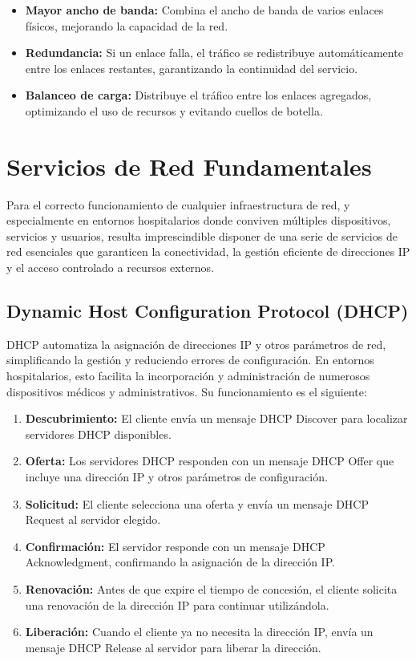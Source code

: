 \begin{itemize}
    \item \textbf{Mayor ancho de banda:} Combina el ancho de banda de varios enlaces físicos, mejorando la capacidad de la red.
    \item \textbf{Redundancia:} Si un enlace falla, el tráfico se redistribuye automáticamente entre los enlaces restantes, garantizando la continuidad del servicio.
    \item \textbf{Balanceo de carga:} Distribuye el tráfico entre los enlaces agregados, optimizando el uso de recursos y evitando cuellos de botella.
\end{itemize}

\section{Servicios de Red Fundamentales}
Para el correcto funcionamiento de cualquier infraestructura de red, y especialmente en entornos hospitalarios donde conviven múltiples dispositivos, servicios y usuarios, 
resulta imprescindible disponer de una serie de servicios de red esenciales que garanticen la conectividad, la gestión eficiente de direcciones IP y el acceso controlado a recursos externos.

\subsection{Dynamic Host Configuration Protocol (DHCP)}
\label{subsec:dhcp}
DHCP automatiza la asignación de direcciones IP y otros parámetros de red, simplificando la gestión y reduciendo errores de configuración. En entornos hospitalarios, esto facilita la 
incorporación y administración de numerosos dispositivos médicos y administrativos. Su funcionamiento es el siguiente:
\begin{enumerate}
    \item \textbf{Descubrimiento:} El cliente envía un mensaje DHCP Discover para localizar servidores DHCP disponibles.
    \item \textbf{Oferta:} Los servidores DHCP responden con un mensaje DHCP Offer que incluye una dirección IP y otros parámetros de configuración.
    \item \textbf{Solicitud:} El cliente selecciona una oferta y envía un mensaje DHCP Request al servidor elegido.
    \item \textbf{Confirmación:} El servidor responde con un mensaje DHCP Acknowledgment, confirmando la asignación de la dirección IP.
    \item \textbf{Renovación:} Antes de que expire el tiempo de concesión, el cliente solicita una renovación de la dirección IP para continuar utilizándola.
    \item \textbf{Liberación:} Cuando el cliente ya no necesita la dirección IP, envía un mensaje DHCP Release al servidor para liberar la dirección.
\end{enumerate}

